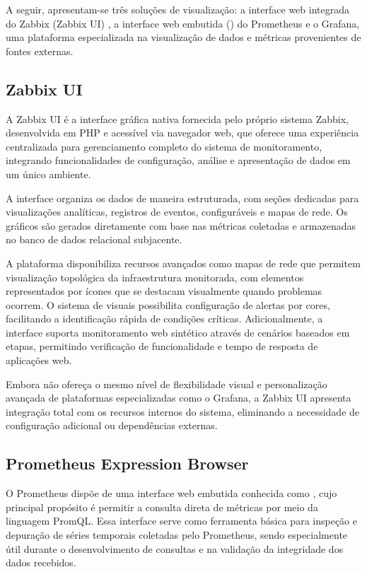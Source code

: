 A seguir, apresentam-se três soluções de visualização: a interface web integrada do Zabbix (Zabbix UI) , a interface web embutida () do Prometheus  e o Grafana, uma plataforma especializada na visualização de dados e métricas provenientes de fontes externas.

\subsection{Zabbix UI}
\label{subsection:ZabbixUI}

A Zabbix UI \citep{zabbix2025} é a interface gráfica nativa fornecida pelo próprio sistema Zabbix, desenvolvida em PHP e acessível via navegador web, que oferece uma experiência centralizada para gerenciamento completo do sistema de monitoramento, integrando funcionalidades de configuração, análise e apresentação de dados em um único ambiente.

A interface organiza os dados de maneira estruturada, com seções dedicadas para visualizações analíticas, registros de eventos,  configuráveis e mapas de rede. Os gráficos são gerados diretamente com base nas métricas coletadas e armazenadas no banco de dados relacional subjacente.

A plataforma disponibiliza recursos avançados como mapas de rede que permitem visualização topológica da infraestrutura monitorada, com elementos representados por ícones que se destacam visualmente quando problemas ocorrem. O sistema de  visuais possibilita configuração de alertas por cores, facilitando a identificação rápida de condições críticas. Adicionalmente, a interface suporta monitoramento web sintético através de cenários baseados em etapas, permitindo verificação de funcionalidade e tempo de resposta de aplicações web.

Embora não ofereça o mesmo nível de flexibilidade visual e personalização avan\-çada de plataformas especializadas como o Grafana, a Zabbix UI apresenta integração total com os recursos internos do sistema, eliminando a necessidade de configuração adicional ou dependências externas.

\subsection{Prometheus Expression Browser}
\label{subsection:PrometheusExpressionBrowser}

O Prometheus dispõe de uma interface web embutida conhecida como  \citep{promexpbrwsr2025}, cujo principal propósito é permitir a consulta direta de métricas por meio da linguagem PromQL. Essa interface serve como ferramenta básica para inspeção e depuração de séries temporais coletadas pelo Prometheus, sendo especialmente útil durante o desenvolvimento de consultas e na validação da integridade dos dados recebidos.

